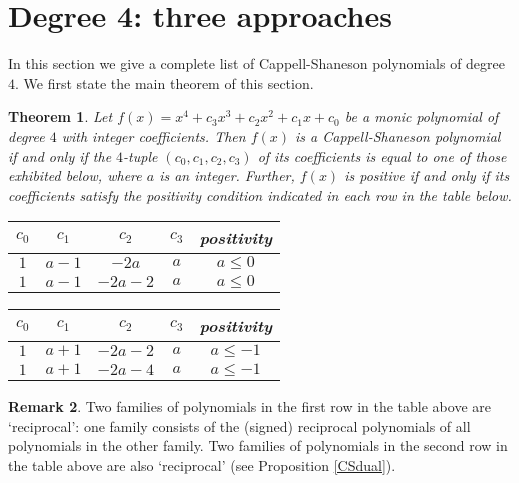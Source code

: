 \documentclass{amsart}
\theoremstyle{plain}
\newtheorem{thm}{Theorem}[section]
\theoremstyle{definition}
\newtheorem{rem}[thm]{Remark}
\theoremstyle{remark}
\begin{document}

\section{Degree 4: three approaches}


In this section we give a complete list of Cappell-Shaneson polynomials of degree $4$. 
We first state the main theorem of this section. 

\begin{thm}\label{CS4}
Let $f(x)=x^4+c_3x^3+c_2x^2+c_1x+c_0$ be a monic polynomial of degree $4$ with integer coefficients. 
Then $f(x)$ is a Cappell-Shaneson polynomial if and only if the $4$-tuple $(c_0,c_1,c_2,c_3)$ of 
its coefficients is equal to one of those exhibited below, where $a$ is an integer. 
Further, $f(x)$ is positive if and only if its coefficients satisfy 
the positivity condition indicated in each row in the table below. 

\medskip

\begin{center}
\begin{tabular}{|c|c|c|c|c|} \hline 
$c_0$ & $c_1$ & $c_2$ & $c_3$ & {\rm positivity} \\ \hline 
$1$ & $a-1$ & $-2a$ & $a$ & $a\leq 0$ \\ \hline
$1$ & $a-1$ & $-2a-2$ & $a$ & $a\leq 0$ \\ \hline
\end{tabular} 
\begin{tabular}{|c|c|c|c|c|} \hline 
$c_0$ & $c_1$ & $c_2$ & $c_3$ & {\rm positivity} \\ \hline 
$1$ & $a+1$ & $-2a-2$ & $a$ & $a\leq -1$ \\ \hline
$1$ & $a+1$ & $-2a-4$ & $a$ & $a\leq -1$ \\ \hline
\end{tabular} 
\end{center}

\end{thm}

\begin{rem}
Two families of polynomials in the first row in the table above are `reciprocal': 
one family consists of the (signed) reciprocal polynomials of all polynomials in the other family. 
Two families of polynomials in the second row in the table above are also `reciprocal' 
(see Proposition \ref{CSdual}). 
\end{rem}
\end{document}
